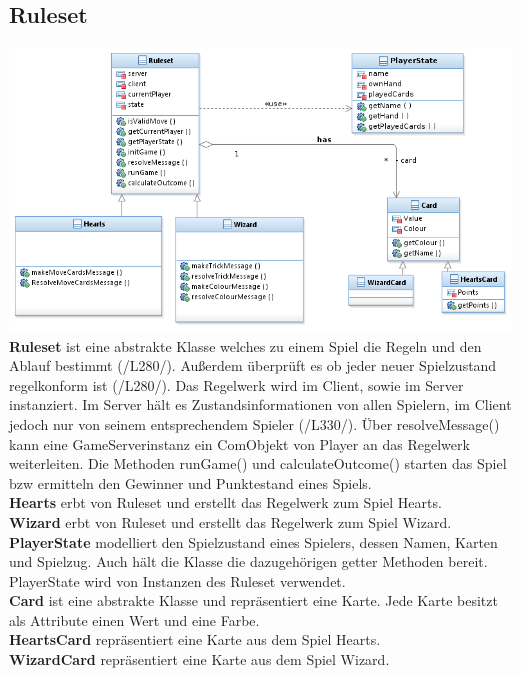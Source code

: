 \documentclass{article}
\begin{document}
\subsection{Ruleset}
\includegraphics[width=\textwidth]{Ruleset}
\textbf{Ruleset} ist eine abstrakte Klasse welches zu einem Spiel die Regeln und den Ablauf bestimmt (/L280/). Außerdem überprüft es ob jeder neuer Spielzustand regelkonform ist (/L280/). Das Regelwerk wird im Client, sowie im Server instanziert. Im Server hält es Zustandsinformationen von allen Spielern, im Client jedoch nur von seinem entsprechendem Spieler (/L330/). Über resolveMessage() kann eine GameServerinstanz ein ComObjekt von Player an das Regelwerk weiterleiten. Die Methoden runGame() und calculateOutcome() starten das Spiel bzw ermitteln den Gewinner und Punktestand eines Spiels. \\
		\textbf{Hearts} erbt von Ruleset und erstellt das Regelwerk zum Spiel Hearts. \\
		\textbf{Wizard} erbt von Ruleset und erstellt das Regelwerk zum Spiel Wizard. \\
		\textbf{PlayerState} modelliert den Spielzustand eines Spielers, dessen Namen, Karten und Spielzug. Auch hält die Klasse die dazugehörigen getter Methoden bereit. PlayerState wird von Instanzen des Ruleset verwendet. \\
		\textbf{Card} ist eine abstrakte Klasse und repräsentiert eine Karte. Jede Karte besitzt als Attribute einen Wert und eine Farbe. \\
		\textbf{HeartsCard} repräsentiert eine Karte aus dem Spiel Hearts. \\
		\textbf{WizardCard} repräsentiert eine Karte aus dem Spiel Wizard.
\end{document}
